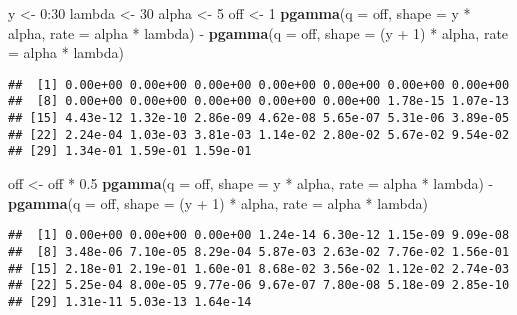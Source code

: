\documentclass[9pt,a5paper,]{book}
\newenvironment{Shaded}{}{}
\newcommand{\KeywordTok}[1]{\textbf{{#1}}}
\newcommand{\DataTypeTok}[1]{\underline{{#1}}}
\newcommand{\DecValTok}[1]{{#1}}
\newcommand{\FloatTok}[1]{{#1}}
\newcommand{\StringTok}[1]{{#1}}
\newcommand{\NormalTok}[1]{{#1}}
\renewenvironment{Shaded}{\color{inputcolor}}{}
\renewcommand{\DataTypeTok}[1]{{#1}}
\theoremstyle{definition}
\theoremstyle{definition}
\theoremstyle{remark}
\begin{document}
\begin{Shaded}
\begin{Highlighting}[]
\NormalTok{y <-}\StringTok{ }\DecValTok{0}\NormalTok{:}\DecValTok{30}
\NormalTok{lambda <-}\StringTok{ }\DecValTok{30}
\NormalTok{alpha <-}\StringTok{ }\DecValTok{5}
\NormalTok{off <-}\StringTok{ }\DecValTok{1}
\KeywordTok{pgamma}\NormalTok{(}\DataTypeTok{q =} \NormalTok{off,}
       \DataTypeTok{shape =} \NormalTok{y *}\StringTok{ }\NormalTok{alpha,}
       \DataTypeTok{rate =} \NormalTok{alpha *}\StringTok{ }\NormalTok{lambda) -}
\StringTok{    }\KeywordTok{pgamma}\NormalTok{(}\DataTypeTok{q =} \NormalTok{off,}
           \DataTypeTok{shape =} \NormalTok{(y +}\StringTok{ }\DecValTok{1}\NormalTok{) *}\StringTok{ }\NormalTok{alpha,}
           \DataTypeTok{rate =} \NormalTok{alpha *}\StringTok{ }\NormalTok{lambda)}
\end{Highlighting}
\end{Shaded}

\begin{verbatim}
##  [1] 0.00e+00 0.00e+00 0.00e+00 0.00e+00 0.00e+00 0.00e+00 0.00e+00
##  [8] 0.00e+00 0.00e+00 0.00e+00 0.00e+00 0.00e+00 1.78e-15 1.07e-13
## [15] 4.43e-12 1.32e-10 2.86e-09 4.62e-08 5.65e-07 5.31e-06 3.89e-05
## [22] 2.24e-04 1.03e-03 3.81e-03 1.14e-02 2.80e-02 5.67e-02 9.54e-02
## [29] 1.34e-01 1.59e-01 1.59e-01
\end{verbatim}

\begin{Shaded}
\begin{Highlighting}[]
\NormalTok{off <-}\StringTok{ }\NormalTok{off *}\StringTok{ }\FloatTok{0.5}
\KeywordTok{pgamma}\NormalTok{(}\DataTypeTok{q =} \NormalTok{off,}
       \DataTypeTok{shape =} \NormalTok{y *}\StringTok{ }\NormalTok{alpha,}
       \DataTypeTok{rate =} \NormalTok{alpha *}\StringTok{ }\NormalTok{lambda) -}
\StringTok{    }\KeywordTok{pgamma}\NormalTok{(}\DataTypeTok{q =} \NormalTok{off,}
           \DataTypeTok{shape =} \NormalTok{(y +}\StringTok{ }\DecValTok{1}\NormalTok{) *}\StringTok{ }\NormalTok{alpha,}
           \DataTypeTok{rate =} \NormalTok{alpha *}\StringTok{ }\NormalTok{lambda)}
\end{Highlighting}
\end{Shaded}

\begin{verbatim}
##  [1] 0.00e+00 0.00e+00 0.00e+00 1.24e-14 6.30e-12 1.15e-09 9.09e-08
##  [8] 3.48e-06 7.10e-05 8.29e-04 5.87e-03 2.63e-02 7.76e-02 1.56e-01
## [15] 2.18e-01 2.19e-01 1.60e-01 8.68e-02 3.56e-02 1.12e-02 2.74e-03
## [22] 5.25e-04 8.00e-05 9.77e-06 9.67e-07 7.80e-08 5.18e-09 2.85e-10
## [29] 1.31e-11 5.03e-13 1.64e-14
\end{verbatim}
\end{document}
